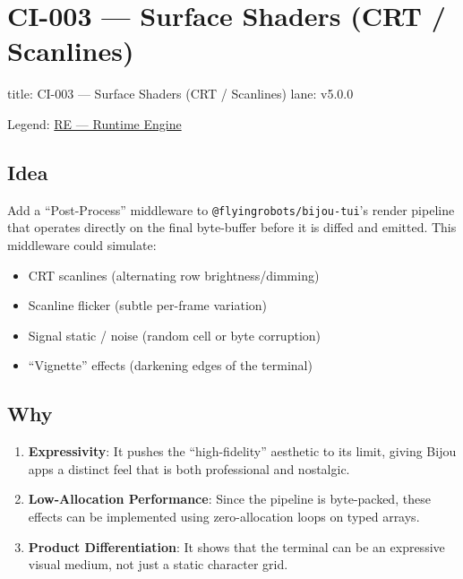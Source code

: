 \chapter{CI-003 --- Surface Shaders (CRT / Scanlines)}\label{record-288}

\smallskip

\begin{RecordMeta}
title: CI-003 — Surface Shaders (CRT / Scanlines)
lane: v5.0.0

\end{RecordMeta}

Legend: \href{https://github.com/flyingrobots/bijou/blob/1853ad902f6bf219326409e7f743a5a1d6517dbc/docs/legends/RE-runtime-engine.md}{RE --- Runtime Engine}

\section{Idea}\label{record-288-idea}

Add a ``Post-Process'' middleware to \texttt{@\allowbreak{}f\allowbreak{}l\allowbreak{}y\allowbreak{}i\allowbreak{}n\allowbreak{}g\allowbreak{}r\allowbreak{}o\allowbreak{}b\allowbreak{}o\allowbreak{}t\allowbreak{}s\allowbreak{}/\allowbreak{}b\allowbreak{}i\allowbreak{}j\allowbreak{}o\allowbreak{}u\allowbreak{}-\allowbreak{}t\allowbreak{}u\allowbreak{}i}'s render pipeline that operates directly on the final byte-buffer before it is diffed and emitted. This middleware could simulate:

\begin{itemize}
\tightlist
\item
  CRT scanlines (alternating row brightness/dimming)
\item
  Scanline flicker (subtle per-frame variation)
\item
  Signal static / noise (random cell or byte corruption)
\item
  ``Vignette'' effects (darkening edges of the terminal)
\end{itemize}

\section{Why}\label{record-288-why}

\begin{enumerate}
\def\labelenumi{\arabic{enumi}.}
\tightlist
\item
  \textbf{Expressivity}: It pushes the ``high-fidelity'' aesthetic to its limit, giving Bijou apps a distinct feel that is both professional and nostalgic.
\item
  \textbf{Low-Allocation Performance}: Since the pipeline is byte-packed, these effects can be implemented using zero-allocation loops on typed arrays.
\item
  \textbf{Product Differentiation}: It shows that the terminal can be an expressive visual medium, not just a static character grid.
\end{enumerate}

